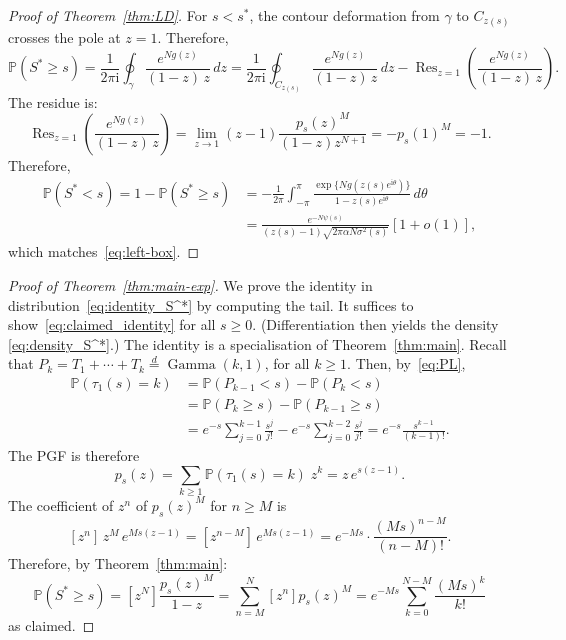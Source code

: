 \documentclass[a4paper,reqno,11pt]{amsart}
\numberwithin{equation}{section}
\def\PR{\mathbb{P}}
\def\PP{{\mathbb P}}
\numberwithin{thm}{section}
\theoremstyle{plain}
\theoremstyle{definition}
\begin{document}
{\begin{proof}[{Proof of Theorem~\ref{thm:LD}}]
For $s<s^*$, the contour deformation from $\gamma$ to $C_{z(s)}$ crosses the pole at $z=1$. Therefore,
\begin{equation}
 \PR(S^*\ge s)
 =\frac{1}{2\pi \mathrm{i}}\oint_{\gamma}
  \frac{e^{Ng(z)}}{(1{-}z)\,z}\,dz= \frac{1}{2\pi \mathrm{i}}\oint_{C_{z(s)}}
  \frac{e^{Ng(z)}}{(1{-}z)\,z}\,dz-\operatorname{Res}_{z=1}\left(\frac{e^{Ng(z)}}{(1{-}z)\,z}\right) . 
\end{equation}
 The residue is:
 \begin{equation}
\operatorname{Res}_{z=1}\left(\frac{e^{Ng(z)}}{(1{-}z)\,z}\right)=\lim_{z\to 1}(z-1)\frac{p_s(z)^M}{(1-z)z^{N+1}}=-p_s(1)^M=-1.
 \end{equation}
 Therefore,
\begin{equation}
\begin{aligned}
\PP(S^*<s)=1- \PR(S^*\geq s)
&=
-\frac{1}{2\pi}
\int_{-\pi}^{\pi}
\frac{
\exp\{N g(z(s)e^{\mathrm{i}\theta})\}
}
{1-z(s)e^{\mathrm{i}\theta}}
\,d\theta  \\
&=
\frac{e^{-N\psi(s)}}{
(z(s)-1)\sqrt{2\pi\alpha N\sigma^2(s)}
}
\left[1+o(1)\right],
\end{aligned}
\end{equation}
which matches~\eqref{eq:left-box}.
\end{proof}




\begin{proof}[Proof of Theorem~\ref{thm:main-exp}]
We prove the identity in distribution~\eqref{eq:identity_S^*} by computing the tail. 
It suffices to show~\eqref{eq:claimed_identity}  for all $s\ge0$.
(Differentiation then yields the density \eqref{eq:density_S^*}.) 
The identity is a specialisation of Theorem~\ref{thm:main}. Recall that $P_k=T_1+\cdots+T_{k}\stackrel{d}{=}\operatorname{Gamma}(k,1)$, for all $k\geq1$. Then, by~\eqref{eq:PL}, 
\begin{equation}
\begin{aligned}
\PP(\tau_1(s)=k)&=
\PP(P_{k-1}< s)- \PP(P_{k}< s)\\
&=\PP(P_k\geq s)- \PP(P_{k-1}\geq s)\\
&=
e^{-s}\sum_{j=0}^{k-1}\frac{s^j}{j!}-e^{-s}\sum_{j=0}^{k-2}\frac{s^j}{j!}=
e^{-s}\frac{s^{k-1}}{(k-1)!}.
\end{aligned}
\end{equation}
The PGF is therefore
\begin{equation}
    p_{s}(z)=\sum_{k\geq1}\PP(\tau_1(s)=k)\;z^k= z\,e^{s(z-1)}.
\end{equation}
The coefficient of $z^n$ of $p_{s}(z)^M$ for $n\ge M$ is
\[
  [z^n]\,z^M\,e^{Ms(z-1)}
  = [z^{n-M}]\,e^{Ms(z-1)}
  = e^{-Ms}\cdot\frac{(Ms)^{n-M}}{(n{-}M)!}.
\]
Therefore, by Theorem~\ref{thm:main}:
\begin{equation}\label{eq:poisson}
  \PR(S^*\geq s) = [z^N]\frac{p_{s}(z)^M}{1-z}=\sum_{n=M}^N[z^n]p_{s}(z)^M=e^{-Ms}\sum_{k=0}^{N-M}\frac{(Ms)^k}{k!}
\end{equation}
as claimed. 


\end{proof}}
\end{document}
